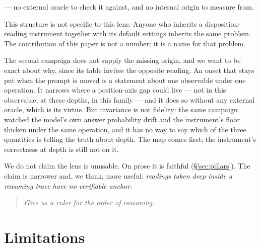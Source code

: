 \documentclass[11pt]{article}
\begin{document}
\noindent
--- no external oracle to check it against, and no internal origin to
measure from.

This structure is not specific to this lens. Anyone who inherits a
disposition-reading instrument together with its default settings
inherits the same problem. The contribution of this paper is not a
number; it is a name for that problem.

The second campaign does not supply the missing origin, and we want to be exact about why, since its table invites the opposite reading. An onset that stays put when the prompt is moved is a statement about one observable under one operation. It narrows where a position-axis gap could live --- not in this observable, at these depths, in this family --- and it does so without any external oracle, which is its virtue. But invariance is not fidelity: the same campaign watched the model's own answer probability drift and the instrument's floor thicken under the same operation, and it has no way to say which of the three quantities is telling the truth about depth. The map comes first; the instrument's correctness at depth is still not on it.

We do not claim the lens is unusable. On prose it is faithful
(\S\ref{sec:pillars}). The claim is narrower and, we think, more useful:
\emph{readings taken deep inside a reasoning trace have no verifiable
anchor.}

\begin{quote}\large\itshape
Give us a ruler for the order of reasoning.
\end{quote}

\section{Limitations}
\label{sec:limits}
\end{document}
